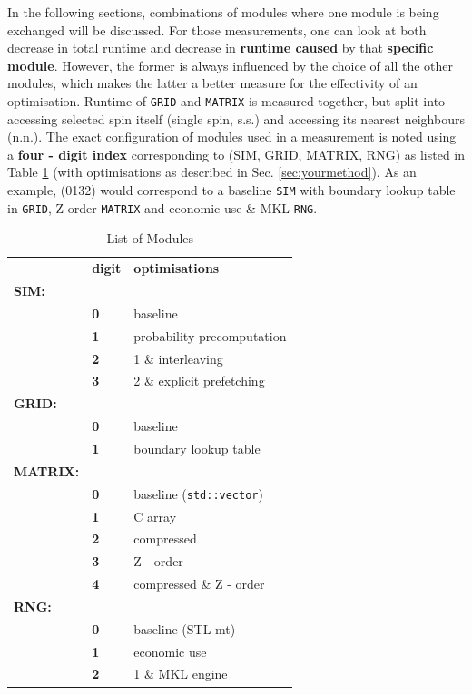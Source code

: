 \documentclass[letterpaper]{article}
\begin{document}
In the following sections, combinations of modules where one module is being exchanged will be discussed. For those measurements, one can look at both decrease in total runtime and decrease in \textbf{runtime caused} by that \textbf{specific module}. However, the former is always influenced by the choice of all the other modules, which makes the latter a better measure for the effectivity of an optimisation.\newline
Runtime of \texttt{GRID} and \texttt{MATRIX} is measured together, but split into accessing selected spin itself (single spin, s.s.) and accessing its nearest neighbours (n.n.). \newline
The exact configuration of modules used in a measurement is noted using a \textbf{four - digit index} corresponding to (SIM, GRID, MATRIX, RNG) as listed in Table \ref{modlist} (with optimisations as described in Sec. \ref{sec:yourmethod}).\newline
As an example, (0132) would correspond to a baseline \texttt{SIM} with boundary lookup table in \texttt{GRID}, Z-order \texttt{MATRIX} and economic use \& MKL \texttt{RNG}. 
\begin{table}[h]
\begin{tabular}{ll|l}
& \textbf{digit} & \textbf{optimisations} \\\cline{2-3}
\textbf{SIM:} \\\hline
& \textbf{0} & baseline \\\cline{2-3}
& \textbf{1} & probability precomputation\\\cline{2-3}
& \textbf{2} & 1 \& interleaving \\\cline{2-3}
& \textbf{3} & 2 \& explicit prefetching\\\cline{2-3}
\textbf{GRID:}\\\hline
& \textbf{0} & baseline \\\cline{2-3}
& \textbf{1} & boundary lookup table \\\cline{2-3}
\textbf{MATRIX:}\\\hline
& \textbf{0} & baseline (\texttt{std::vector}) \\\cline{2-3}
& \textbf{1} & C array \\\cline{2-3}
& \textbf{2} & compressed \\\cline{2-3}
& \textbf{3} & Z - order \\\cline{2-3}
& \textbf{4} & compressed \& Z - order\\\cline{2-3}
\textbf{RNG:} \\\hline
& \textbf{0} & baseline (STL mt)\\\cline{2-3}
& \textbf{1} & economic use \\\cline{2-3}
& \textbf{2} & 1 \& MKL engine\\\cline{2-3}
\end{tabular}
\caption{List of Modules}
\label{modlist}
\end{table}
\end{document}

